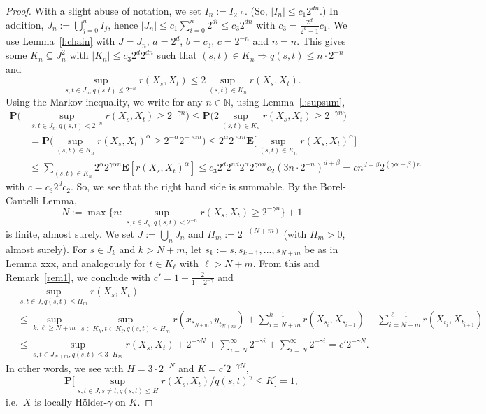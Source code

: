 \documentclass{article}
\theoremstyle{definition}
\theoremstyle{step} \newtheorem{step}{Step}
\begin{document}
\begin{proof}
  With a slight abuse of notation, we set $I_n := I_{2^{-n}}$. (So, $|I_n| \leq c_1 2^{dn}$.) In addition, $J_n := \bigcup_{j=0}^n I_j$, hence $|J_n| \leq c_1 \sum_{i=0}^n 2^{di} \leq c_3 2^{dn}$ with $c_3 = \frac{2^d}{2^d-1}c_1$. We use Lemma~\ref{l:chain} with $J = J_n$, $a = 2^d$, $b = c_3$, $c = 2^{-n}$ and $n=n$. This gives some $K_n \subseteq J_n^2$ with $|K_n| \leq c_3 2^d 2^{dn}$ such that $(s,t) \in K_n \Rightarrow q(s,t) \leq n\cdot 2^{-n}$ and
  $$\sup_{s,t \in J_n, q(s,t) \leq 2^{-n}} r(X_s, X_t) \leq 2 \sup_{(s,t) \in K_n}  r(X_s, X_t).$$
  Using the Markov inequality, we write for any $n\in\mathbb N$, using Lemma~\ref{l:supsum},
  \begin{align*}
    \mathbf P\Big( & \sup_{s,t\in J_n, q(s,t) < 2^{-n}} r(X_s, X_t)
    \geq 2^{-\gamma n} \Big) \leq
    \mathbf P\Big( 2\sup_{(s,t)\in K_n} r(X_s, X_t)
    \geq 2^{-\gamma n} \Big)                                               \\ & = \mathbf P\Big( \sup_{(s,t)\in K_n} r(X_s, X_t)^\alpha
    \geq 2^{-\alpha} 2^{-\gamma \alpha n} \Big) \leq 2^\alpha 2^{\gamma \alpha n}\mathbf
    E\Big[\sup_{(s,t) \in K_n} r(X_s, X_t)^\alpha \Big]
    \\ & \leq \sum_{(s,t)\in K_n} 2^\alpha 2^{\gamma\alpha
        n}\mathbf E[r(X_s,X_t)^\alpha] \leq c_3 2^d 2^{nd} 2^\alpha 2^{\gamma\alpha n}
    c_2 (3n\cdot 2^{-n})^{d + \beta} = c n^{d + \beta} 2^{(\gamma\alpha - \beta)n}
  \end{align*}
  with $c = c_3 2^d c_2$. So, we see that the right hand side is summable. By the
  Borel-Cantelli Lemma,
  $$ N := \max \Big\{n: \sup_{s,t\in J_n, q(s,t) < 2^{-n}} r(X_s, X_t)
    \geq 2^{-\gamma n}\Big\} + 1$$ 
  is finite, almost surely. We set $J := \bigcup_n J_n$ and $H_m := 2^{-(N+m)}$ (with $H_m>0$, almost surely). For $s\in J_k$ and $k>N+m$, let $s_k := s, s_{k-1},...,s_{N+m}$ be as in Lemma xxx, and analogously for $t\in K_\ell$ with $\ell > N+m$. From this and Remark~\ref{rem1}, we conclude with $c' = 1 + \frac{2}{1-2^{-\gamma}}$ and
  \begin{align*}
    & \sup_{s,t\in J, q(s,t) \leq H_m} r(X_s, X_t)
    \\ & \leq
    \sup_{k, \ell \geq N+m} \sup_{s \in K_k, t\in K_\ell, q(s,t) \leq H_m} r(x_{s_{N+m}}, y_{t_{N+m}}) + \sum_{i=N+m}^{k-1} r(X_{s_i}, X_{s_{i+1}}) +
    \sum_{i=N+m}^{\ell-1} r(X_{t_i}, X_{t_{i+1}})    \\ &
    \leq \sup_{s,t \in J_{N+m}, q(s,t) \leq 3\cdot H_m} r(X_s, X_t) +  2^{-\gamma N} + \sum_{i=N}^\infty 2^{-\gamma i} + \sum_{i=N}^\infty 2^{-\gamma i}
    = c' 2^{-\gamma N}.
  \end{align*}
  In other words, we see with $H = 3\cdot 2^{-N}$ and $K = c' 2^{-\gamma N}$,
  $$ \mathbf P\Big[\sup_{s,t\in J, s\neq t, q(s,t) \leq H} r(X_s,
      X_t)/q(s,t)^\gamma \leq K\Big] = 1,
  $$
  i.e.\ $X$ is locally Hölder-$\gamma$ on $K$.


\end{proof}
\end{document}
